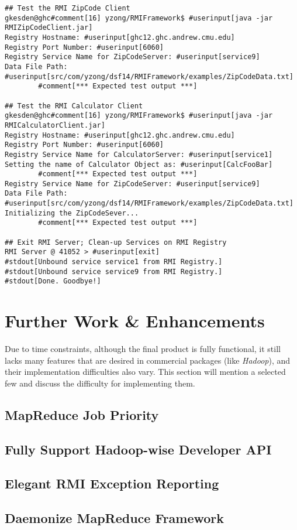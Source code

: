 \documentclass{article} %
\begin{document}
{\begin{Verbatim}[fontsize=\small, xleftmargin=-.5in,commandchars=\#\[\]]
## Test the RMI ZipCode Client
gkesden@ghc#comment[16] yzong/RMIFramework$ #userinput[java -jar RMIZipCodeClient.jar]
Registry Hostname: #userinput[ghc12.ghc.andrew.cmu.edu]
Registry Port Number: #userinput[6060]
Registry Service Name for ZipCodeServer: #userinput[service9]
Data File Path: #userinput[src/com/yzong/dsf14/RMIFramework/examples/ZipCodeData.txt]
        #comment[*** Expected test output ***]

## Test the RMI Calculator Client
gkesden@ghc#comment[16] yzong/RMIFramework$ #userinput[java -jar RMICalculatorClient.jar]
Registry Hostname: #userinput[ghc12.ghc.andrew.cmu.edu]
Registry Port Number: #userinput[6060]
Registry Service Name for CalculatorServer: #userinput[service1]
Setting the name of Calculator Object as: #userinput[CalcFooBar]
        #comment[*** Expected test output ***]
Registry Service Name for ZipCodeServer: #userinput[service9]
Data File Path: #userinput[src/com/yzong/dsf14/RMIFramework/examples/ZipCodeData.txt]
Initializing the ZipCodeSever...
        #comment[*** Expected test output ***]
        
## Exit RMI Server; Clean-up Services on RMI Registry
RMI Server @ 41052 > #userinput[exit]
#stdout[Unbound service service1 from RMI Registry.]
#stdout[Unbound service service9 from RMI Registry.]
#stdout[Done. Goodbye!]
\end{Verbatim}
}

\section{Further Work \& Enhancements}

Due to time constraints, although the final product is fully functional, it still lacks many features that are desired in commercial packages (like \emph{Hadoop}), and their implementation difficulties also vary. This section will mention a selected few and discuss the difficulty for implementing them.

\subsection{MapReduce Job Priority}


\subsection{Fully Support Hadoop-wise Developer API}


\subsection{Elegant RMI Exception Reporting}


\subsection{Daemonize MapReduce Framework}

\end{document}
